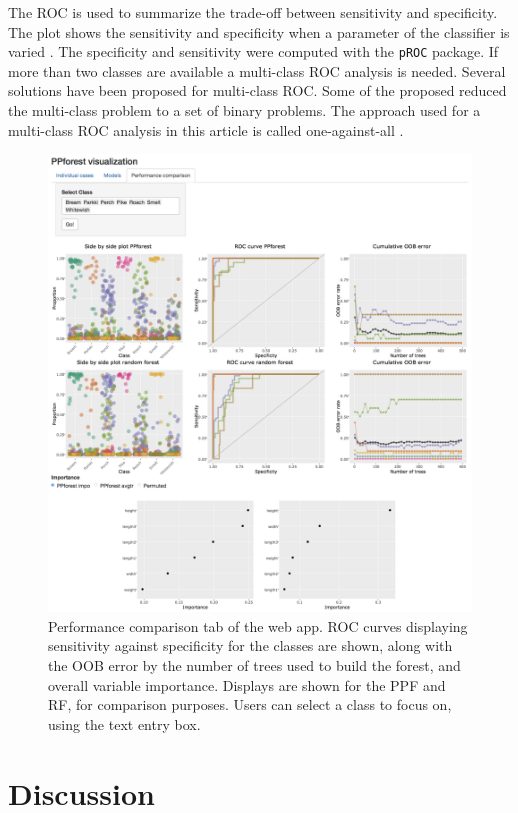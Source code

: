 \documentclass[smallextended,natbib]{svjour3}\usepackage[]{graphicx}\usepackage[]{xcolor}
\begin{document}
 The  ROC is used to summarize the trade-off between sensitivity and specificity. The plot shows the sensitivity and specificity when a parameter of the classifier is varied \citep{trevor2011elements}. The specificity and sensitivity were computed with the \verb#pROC# package.
 If more than two classes are available a multi-class ROC analysis is needed. Several solutions have been proposed for multi-class ROC. Some of the proposed reduced the multi-class problem to a set of binary problems. 
The approach used for a multi-class ROC analysis in this article is called one-against-all \citep{allwein2000reducing}.

\begin{figure}[hbpt]
\includegraphics[width=1\linewidth]{fish31.png}
\caption{Performance comparison tab of the web app. ROC curves displaying sensitivity against specificity for the classes are shown, along with the OOB error by the number of trees used to build the forest, and overall variable importance. Displays are shown for the PPF and RF, for comparison purposes. Users can select a class to focus on, using the text entry box. \label{tab3}}
\end{figure}
\newpage

\section{Discussion}\label{fur}
\end{document}
